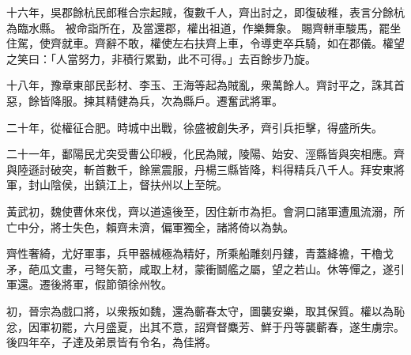 \begin{pinyinscope}
 
十六年，吳郡餘杭民郎稚合宗起賊，復數千人，齊出討之，即復破稚，表言分餘杭為臨水縣。
 被命詣所在，及當還郡，權出祖道，作樂舞象。
 賜齊軿車駿馬，罷坐住駕，使齊就車。齊辭不敢，權使左右扶齊上車，令導吏卒兵騎，如在郡儀。權望之笑曰：「人當努力，非積行累勤，此不可得。」去百餘步乃旋。
 
 
 
 
 十八年，豫章東部民彭材、李玉、王海等起為賊亂，衆萬餘人。齊討平之，誅其首惡，餘皆降服。揀其精健為兵，次為縣戶。遷奮武將軍。
 
 
二十年，從權征合肥。時城中出戰，徐盛被創失矛，齊引兵拒擊，得盛所失。
 
 
 
 
 二十一年，鄱陽民尤突受曹公印綬，化民為賊，陵陽、始安、涇縣皆與突相應。齊與陸遜討破突，斬首數千，餘黨震服，丹楊三縣皆降，料得精兵八千人。拜安東將軍，封山陰侯，出鎮江上，督扶州以上至皖。
 
 
 
 
 黃武初，魏使曹休來伐，齊以道遠後至，因住新市為拒。會洞口諸軍遭風流溺，所亡中分，將士失色，賴齊未濟，偏軍獨全，諸將倚以為埶。
 
 
 
 
 齊性奢綺，尤好軍事，兵甲器械極為精好，所乘船雕刻丹鏤，青蓋絳襜，干櫓戈矛，葩瓜文畫，弓弩矢箭，咸取上材，蒙衝鬬艦之屬，望之若山。休等憚之，遂引軍還。遷後將軍，假節領徐州牧。
 
 
初，晉宗為戲口將，以衆叛如魏，還為蘄春太守，圖襲安樂，取其保質。權以為恥忿，因軍初罷，六月盛夏，出其不意，詔齊督麋芳、鮮于丹等襲蘄春，遂生虜宗。後四年卒，子達及弟景皆有令名，為佳將。
 
 
\end{pinyinscope}